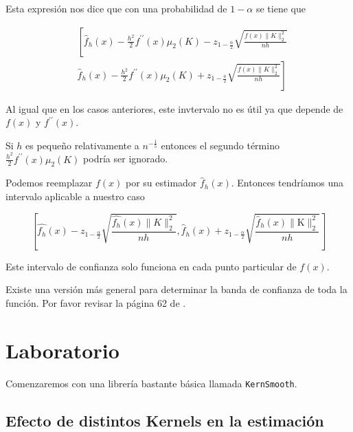 \documentclass[
  12pt,
]{book}
\theoremstyle{definition}
\theoremstyle{definition}
\theoremstyle{definition}
\theoremstyle{remark}
\let\BeginKnitrBlock\begin \let\EndKnitrBlock\end
\begin{document}
Esta expresión nos dice que con una probabilidad de \(1-\alpha\) se tiene que

\begin{equation*}
\begin{aligned}
& \left[\hat{f}_{h}(x)-\frac{h^{2}}{2} f^{\prime \prime}(x) \mu_{2}(K)-z_{1-\frac{\alpha}{2}} \sqrt{\frac{f(x)\|K\|_{2}^{2}}{n h}}\right. \\
& \left.\widehat{f}_{h}(x)-\frac{h^{2}}{2} f^{\prime \prime}(x) \mu_{2}(K)+z_{1-\frac{a}{2}} \sqrt{\frac{f(x)\|K\|_{2}^{2}}{n h}}\right]
\end{aligned}
\end{equation*}

Al igual que en los casos anteriores, este invtervalo no es útil ya que depende de \(f(x)\) y \(f^{\prime\prime} (x)\).

Si \(h\) es pequeño relativamente a \(n^{-\frac{1}{5}}\) entonces el segundo término \(\frac{h^{2}}{2} f^{\prime \prime}(x) \mu_{2}(K)\) podría ser ignorado.

Podemos reemplazar \(f(x)\) por su estimador \(\hat{f}_{h}(x)\). Entonces tendríamos una intervalo aplicable a nuestro caso

\begin{equation*}
\left[\hat{f_{h}}(x)-z_{1-\frac{\alpha}{2}} \sqrt{\frac{\hat{f_{h}}(x)\|K\|_{2}^{2}}{n h}}, \hat{f}_{h}(x)+z_{1-\frac{\alpha}{2}} \sqrt{\frac{\hat{f}_{h}(x)\|\mathrm{K}\|_{2}^{2}}{n h}}\right]
\end{equation*}

\BeginKnitrBlock{remark}
{}Este intervalo de confianza solo funciona en cada punto particular de \(f(x)\).

Existe una versión más general para determinar la banda de confianza de toda la función. Por favor revisar la página 62 de \autocite{Hardle2004}.
\EndKnitrBlock{remark}

\hypertarget{laboratorio}{%
\section{Laboratorio}\label{laboratorio}}

Comenzaremos con una librería bastante básica llamada \texttt{KernSmooth}.

\hypertarget{efecto-de-distintos-kernels-en-la-estimaciuxf3n}{%
\subsection{Efecto de distintos Kernels en la estimación}\label{efecto-de-distintos-kernels-en-la-estimaciuxf3n}}
\end{document}

